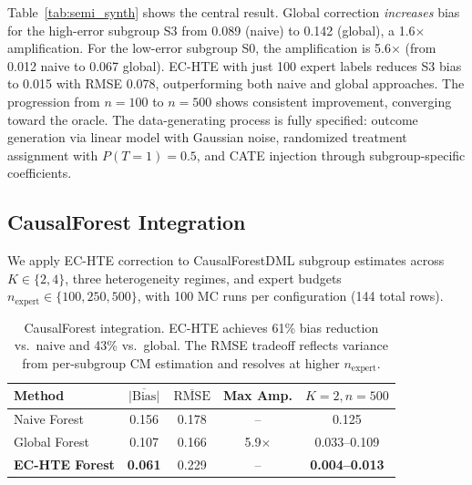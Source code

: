 \documentclass[11pt,twocolumn]{article}
\begin{document}
Table~\ref{tab:semi_synth} shows the central result. Global correction \emph{increases} bias for the high-error subgroup S3 from 0.089 (naive) to 0.142 (global), a 1.6$\times$ amplification. For the low-error subgroup S0, the amplification is 5.6$\times$ (from 0.012 naive to 0.067 global). EC-HTE with just 100 expert labels reduces S3 bias to 0.015 with RMSE 0.078, outperforming both naive and global approaches. The progression from $n\!=\!100$ to $n\!=\!500$ shows consistent improvement, converging toward the oracle. The data-generating process is fully specified: outcome generation via linear model with Gaussian noise, randomized treatment assignment with $P(T\!=\!1) = 0.5$, and CATE injection through subgroup-specific coefficients.

\subsection{CausalForest Integration}
\label{sec:cf_exp}

We apply EC-HTE correction to CausalForestDML \cite{athey2019} subgroup estimates across $K \in \{2, 4\}$, three heterogeneity regimes, and expert budgets $n_{\text{expert}} \in \{100, 250, 500\}$, with 100 MC runs per configuration (144 total rows).

\begin{table}[t]
\centering
\caption{CausalForest integration. EC-HTE achieves 61\% bias reduction vs.\ naive and 43\% vs.\ global. The RMSE tradeoff reflects variance from per-subgroup CM estimation and resolves at higher $n_{\text{expert}}$.}
\label{tab:cf_results}
\small
\begin{tabular}{@{}lcccc@{}}
\toprule
Method & $\overline{|\text{Bias}|}$ & $\overline{\text{RMSE}}$ & Max Amp. & $K\!=\!2,n\!=\!500$ \\
\midrule
Naive Forest & 0.156 & 0.178 & -- & 0.125 \\
Global Forest & 0.107 & 0.166 & 5.9$\times$ & 0.033--0.109 \\
\textbf{EC-HTE Forest} & \textbf{0.061} & 0.229 & -- & \textbf{0.004--0.013} \\
\bottomrule
\end{tabular}
\end{table}
\end{document}
